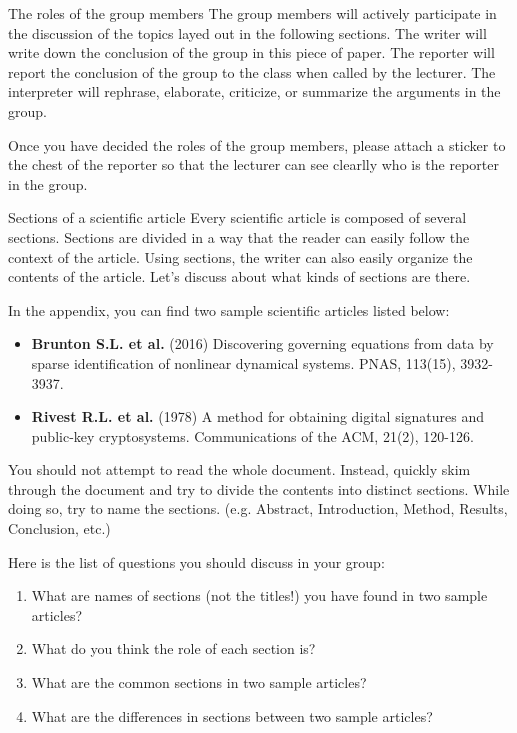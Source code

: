 \documentclass{beamer}
\begin{document}
\begin{frame}{The roles of the group members}
The group members will actively participate in the discussion of the topics layed out in the following sections.
The writer will write down the conclusion of the group in this piece of paper.
The reporter will report the conclusion of the group to the class when called by the lecturer.
The interpreter will rephrase, elaborate, criticize, or summarize the arguments in the group.

Once you have decided the roles of the group members, please attach a sticker to the chest of the reporter so that the lecturer can see clearlly who is the reporter in the group.
\end{frame}

\begin{frame}{Sections of a scientific article}
Every scientific article is composed of several sections.
Sections are divided in a way that the reader can easily follow the context of the article.
Using sections, the writer can also easily organize the contents of the article.
Let's discuss about what kinds of sections are there.
\end{frame}

\begin{frame}
In the appendix, you can find two sample scientific articles listed below:
\begin{itemize}
    \item \textbf{Brunton S.L. et al.} (2016) Discovering governing equations from data by sparse identification of nonlinear dynamical systems. PNAS, 113(15), 3932-3937.
    \item \textbf{Rivest R.L. et al.} (1978) A method for obtaining digital signatures and public-key cryptosystems. Communications of the ACM, 21(2), 120-126.
\end{itemize}
You should not attempt to read the whole document.
Instead, quickly skim through the document and try to divide the contents into distinct sections.
While doing so, try to name the sections. (e.g. Abstract, Introduction, Method, Results, Conclusion, etc.) 
\end{frame}

\begin{frame}
Here is the list of questions you should discuss in your group:
\begin{enumerate}
    \item What are names of sections (not the titles!) you have found in two sample articles? 
    \item What do you think the role of each section is?
    \item What are the common sections in two sample articles?
    \item What are the differences in sections between two sample articles?
\end{enumerate}
\end{frame}
\end{document}
